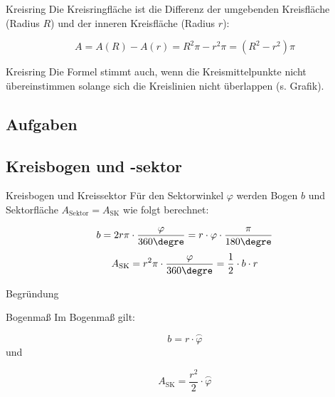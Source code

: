 
\begin{gesetz}{Kreisring}{}
  Die Kreisringfläche ist die Differenz der umgebenden Kreisfläche
  (Radius $R$) und
  der inneren Kreisfläche (Radius $r$):

  $$A = A(R) - A(r) = R^2\pi - r^2\pi = (R^2-r^2)\pi$$
\end{gesetz}

\begin{bemerkung}{Kreisring}{}
  Die Formel stimmt auch, wenn die Kreismittelpunkte nicht
  übereinstimmen solange sich die Kreislinien nicht überlappen (s. Grafik).
  \end{bemerkung}

\subsection*{Aufgaben}


\newpage


\subsection{Kreisbogen und -sektor}
\begin{gesetz}{Kreisbogen und
    Kreissektor}{}
  Für den Sektorwinkel $\varphi$ werden Bogen $b$ und Sektorfläche
  $A_{\text{Sektor}}=A_{\text{SK}}$ wie folgt berechnet:
  
  $$b = 2r\pi \cdot{}\frac{\varphi}{360\degre} = r\cdot{} \varphi
  \cdot{} \frac{\pi}{180\degre}$$
  $$A_{\text{SK}} = r^2\pi\cdot{}\frac{\varphi}{360\degre} = \frac12\cdot{}b\cdot{}r$$
\end{gesetz}


Begründung



\begin{gesetz}{Bogenmaß}{}
  Im Bogenmaß gilt:

  $$b = r\cdot{} \stackrel{\frown}{\varphi}$$
  und

  $$A_{\text{SK}} = \frac{r^2}{2}\cdot{} \stackrel{\frown}{\varphi}$$
\end{gesetz}


